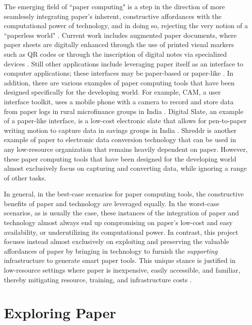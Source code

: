 \documentclass{sig-alternate}
\begin{document}
The emerging field of ``paper computing" is a step in the direction of more seamlessly integrating paper's inherent, constructive affordances with the computational power of technology, and in doing so, rejecting the very notion of a ``paperless world" \cite{kaplan2010}. Current work includes augmented paper documents, where paper sheets are digitally enhanced through the use of printed visual markers such as QR codes \cite{kaplan2010} or through the inscription of digital notes via specialized devices \cite{anoto, pietrzak2010}. Still other applications include leveraging paper itself as an interface to computer applications; these interfaces may be paper-based \cite{bonnard2010, portocarrero2010} or paper-like \cite{qi2010, coelho2009}. In addition, there are various examples of paper computing tools that have been designed specifically for the developing world. For example, CAM, a user interface toolkit, uses a mobile phone with a camera to record and store data from paper logs in rural microfinance groups in India \cite{parikh2006}. Digital Slate, an example of a paper-like interface, is a low-cost electronic slate that allows for pen-to-paper writing motion to capture data in savings groups in India \cite{ratan2010}. Shreddr is another example of paper to electronic data conversion technology that can be used in any low-resource organization that remains heavily dependent on paper\cite{chen2012}. However, these paper computing tools that have been designed for the developing world almost exclusively focus on capturing and converting data, while ignoring a range of other tasks.

In general, in the best-case scenarios for paper computing tools, the constructive benefits of paper and technology are leveraged equally. In the worst-case scenarios, as is usually the case, these instances of the integration of paper and technology almost always end up compromising on paper's low-cost and easy availability, or underutilizing its computational power. In contrast, this project focuses instead almost exclusively on exploiting and preserving the valuable affordances of paper by bringing in technology to furnish the \emph{supporting} infrastructure to generate smart paper tools. This unique stance is justified in low-resource settings where paper is inexpensive, easily accessible, and familiar, thereby mitigating resource, training, and infrastructure costs \cite{chen2012}.



\section{Exploring Paper}
\label{sec:exploring-paper}
\end{document}

